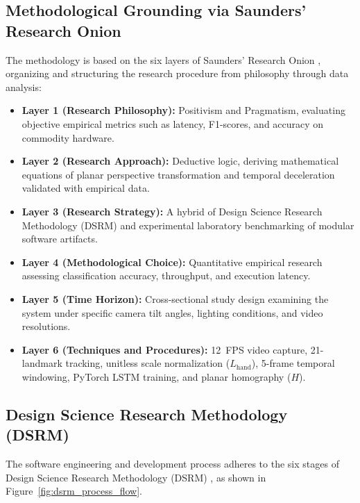\subsection{Methodological Grounding via Saunders' Research Onion}
\label{subsec:meth_saunders_onion}
The methodology is based on the six layers of Saunders' Research Onion \cite{ReviewVirtualKeyboard2020}, organizing and structuring the research procedure from philosophy through data analysis:
\begin{itemize}
    \item \textbf{Layer 1 (Research Philosophy):} Positivism and Pragmatism, evaluating objective empirical metrics such as latency, F1-scores, and accuracy on commodity hardware.
    \item \textbf{Layer 2 (Research Approach):} Deductive logic, deriving mathematical equations of planar perspective transformation and temporal deceleration validated with empirical data.
    \item \textbf{Layer 3 (Research Strategy):} A hybrid of Design Science Research Methodology (DSRM) and experimental laboratory benchmarking of modular software artifacts.
    \item \textbf{Layer 4 (Methodological Choice):} Quantitative empirical research assessing classification accuracy, throughput, and execution latency.
    \item \textbf{Layer 5 (Time Horizon):} Cross-sectional study design examining the system under specific camera tilt angles, lighting conditions, and video resolutions.
    \item \textbf{Layer 6 (Techniques and Procedures):} 12~FPS video capture, 21-landmark tracking, unitless scale normalization ($L_{\text{hand}}$), 5-frame temporal windowing, PyTorch LSTM training, and planar homography ($H$).
\end{itemize}

\subsection{Design Science Research Methodology (DSRM)}
\label{subsec:meth_dsrm}
The software engineering and development process adheres to the six stages of Design Science Research Methodology (DSRM) \cite{ReviewVirtualKeyboard2020}, as shown in Figure~\ref{fig:dsrm_process_flow}.

